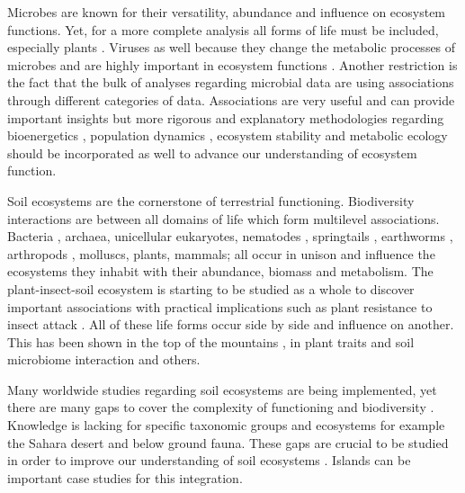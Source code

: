 Microbes are known for their versatility, abundance and influence on ecosystem
functions. Yet, for a more complete analysis all forms of life must be included,
especially plants \parencite{thompson2012Food}. Viruses as well because they
change the metabolic processes of microbes and are highly important in
ecosystem functions \parencite{hurwitz2016Viral}. Another restriction is the fact
that the bulk of analyses regarding microbial data are using associations
through different categories of data. Associations are very useful and can
provide important insights but more rigorous and explanatory methodologies
regarding bioenergetics \parencite{kempes2012Growth}, population dynamics
\parencite{gonze2018Microbial}, ecosystem stability \parencite{berdugo2020Global} and
metabolic ecology \parencite{brown2004METABOLIC} should be incorporated as well to
advance our understanding of ecosystem function.

Soil ecosystems are the cornerstone of terrestrial functioning.
Biodiversity interactions are between all domains of life which form
multilevel associations. Bacteria \parencite{Delgado-Baquerizo-atlas}, archaea,
unicellular eukaryotes, nematodes \parencite{vandenHoogen2019},
springtails \parencite{potapov2023Globally}, earthworms \parencite{Phillips2021},
arthropods \parencite{milo-arthropods}, molluscs, plants, mammals; all occur in unison and 
influence the ecosystems they inhabit with their abundance, biomass \parencite{bar2018biomass} and metabolism.
The plant-insect-soil ecosystem is starting to be studied as a whole to discover
important associations with practical implications such as plant resistance 
to insect attack \parencite{plant-insect-soil2023}.
All of these life forms occur side by side and influence on another. This has been shown in the 
top of the mountains \parencite{winkler2018side}, in plant traits and soil microbiome interaction \parencite{beugnon2022Abiotic} and others. 

Many worldwide studies regarding soil ecosystems are being implemented, yet
there are many gaps to cover the complexity of functioning and biodiversity
\parencite{guerra2020Blind}. Knowledge is lacking for specific taxonomic groups and
ecosystems for example the Sahara desert and below ground fauna.
These gaps are crucial to be studied in order to
improve our understanding of soil ecosystems \parencite{cameron2018Global}. 
Islands can be important case studies for this integration.



